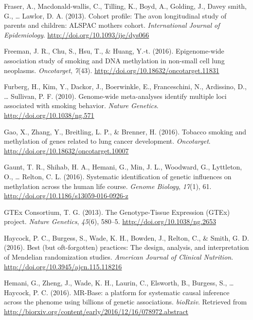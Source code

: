 \documentclass[11pt,twoside]{bristolthesis}
\newlength{\cslhangindent}
\newenvironment{cslreferences}%
  {\setlength{\parindent}{0pt}%
  \everypar{\setlength{\hangindent}{\cslhangindent}}\ignorespaces}%
  {\par}
\begin{document}
\begin{cslreferences}
\leavevmode\hypertarget{ref-Fraser2013}{}%
Fraser, A., Macdonald-wallis, C., Tilling, K., Boyd, A., Golding, J., Davey smith, G., \ldots{} Lawlor, D. A. (2013). Cohort profile: The avon longitudinal study of parents and children: ALSPAC mothers cohort. \emph{International Journal of Epidemiology}. \url{http://doi.org/10.1093/ije/dys066}

\leavevmode\hypertarget{ref-Freeman2016}{}%
Freeman, J. R., Chu, S., Hsu, T., \& Huang, Y.-t. (2016). Epigenome-wide association study of smoking and DNA methylation in non-small cell lung neoplasms. \emph{Oncotarget}, \emph{7}(43). \url{http://doi.org/10.18632/oncotarget.11831}

\leavevmode\hypertarget{ref-Furberg2010}{}%
Furberg, H., Kim, Y., Dackor, J., Boerwinkle, E., Franceschini, N., Ardissino, D., \ldots{} Sullivan, P. F. (2010). Genome-wide meta-analyses identify multiple loci associated with smoking behavior. \emph{Nature Genetics}. \url{http://doi.org/10.1038/ng.571}

\leavevmode\hypertarget{ref-Gao2016}{}%
Gao, X., Zhang, Y., Breitling, L. P., \& Brenner, H. (2016). Tobacco smoking and methylation of genes related to lung cancer development. \emph{Oncotarget}. \url{http://doi.org/10.18632/oncotarget.10007}

\leavevmode\hypertarget{ref-Gaunt2016}{}%
Gaunt, T. R., Shihab, H. A., Hemani, G., Min, J. L., Woodward, G., Lyttleton, O., \ldots{} Relton, C. L. (2016). Systematic identification of genetic influences on methylation across the human life course. \emph{Genome Biology}, \emph{17}(1), 61. \url{http://doi.org/10.1186/s13059-016-0926-z}

\leavevmode\hypertarget{ref-GTExConsortium2013}{}%
GTEx Consortium, T. G. (2013). The Genotype-Tissue Expression (GTEx) project. \emph{Nature Genetics}, \emph{45}(6), 580--5. \url{http://doi.org/10.1038/ng.2653}

\leavevmode\hypertarget{ref-Haycock2016}{}%
Haycock, P. C., Burgess, S., Wade, K. H., Bowden, J., Relton, C., \& Smith, G. D. (2016). Best (but oft-forgotten) practices: The design, analysis, and interpretation of Mendelian randomization studies. \emph{American Journal of Clinical Nutrition}. \url{http://doi.org/10.3945/ajcn.115.118216}

\leavevmode\hypertarget{ref-Hemani2016}{}%
Hemani, G., Zheng, J., Wade, K. H., Laurin, C., Elsworth, B., Burgess, S., \ldots{} Haycock, P. C. (2016). MR-Base: a platform for systematic causal inference across the phenome using billions of genetic associations. \emph{bioRxiv}. Retrieved from \url{http://biorxiv.org/content/early/2016/12/16/078972.abstract}


\end{cslreferences}
\end{document}
